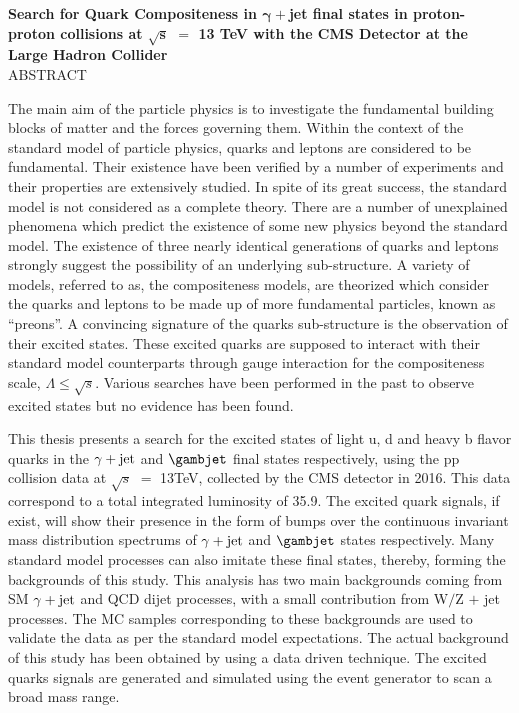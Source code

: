 \begin{center}
  {\large \textbf{Search for Quark Compositeness in $\mathbold{\gamma}+$jet final states in proton-proton collisions at $\mathbold{\sqrt{s}}$ $=$ 13 TeV with the CMS Detector at the Large Hadron Collider}} \\
%
%
%
%
\vspace{0.4cm}
%
{\large {ABSTRACT}}
\end{center}
\onehalfspacing
The main aim of the particle physics is to investigate the fundamental building blocks of matter and the forces governing them. Within the
context of the standard model of particle physics, quarks and leptons are considered to be fundamental. Their existence have been verified
by a number of experiments and their properties are extensively studied. In spite of its great success, the standard model is not considered as a
complete theory. There are a number of unexplained phenomena which predict the existence of some new physics beyond the standard model. The existence of three
nearly identical generations of quarks and leptons strongly suggest the possibility of an underlying sub-structure. A variety of models, referred to as,
the compositeness models, are theorized which consider the quarks and leptons to be made up of more fundamental particles, known as ``preons''. A convincing
signature of the quarks sub-structure is the observation of their excited states. These excited quarks are supposed to interact with
their standard model counterparts through gauge interaction for the compositeness scale, $\Lambda\le\sqrt{s}$. Various searches have been performed in the
past to observe excited states but no evidence has been found. 

This thesis presents a search for the excited states of light u, d and heavy b flavor quarks in the $\gamma+\mathrm{jet}$ and $\gambjet$ final states respectively, using the
pp collision data at $\sqrt{s}$ $=$ 13\unit{TeV}, collected by the CMS detector in 2016. This data correspond to a total integrated luminosity of
35.9\unit{\fbinv}. The excited quark signals, if exist, will show their presence in the form of bumps over the continuous invariant mass distribution spectrums
of $\gamma+\mathrm{jet}$ and $\gambjet$ states respectively. Many standard model processes can also imitate these final states, thereby, forming
the backgrounds of this study. This analysis has two main backgrounds coming from SM $\gamma+\mathrm{jet}$ and QCD dijet processes, with a small contribution from W$/$Z $+$ jet
processes. The MC samples corresponding to these backgrounds are used to validate the data as per the standard model expectations.
The actual background of this study has been
obtained by using a data driven technique. The excited quarks signals are generated and simulated using the event generator \pythia to scan a broad mass range.

